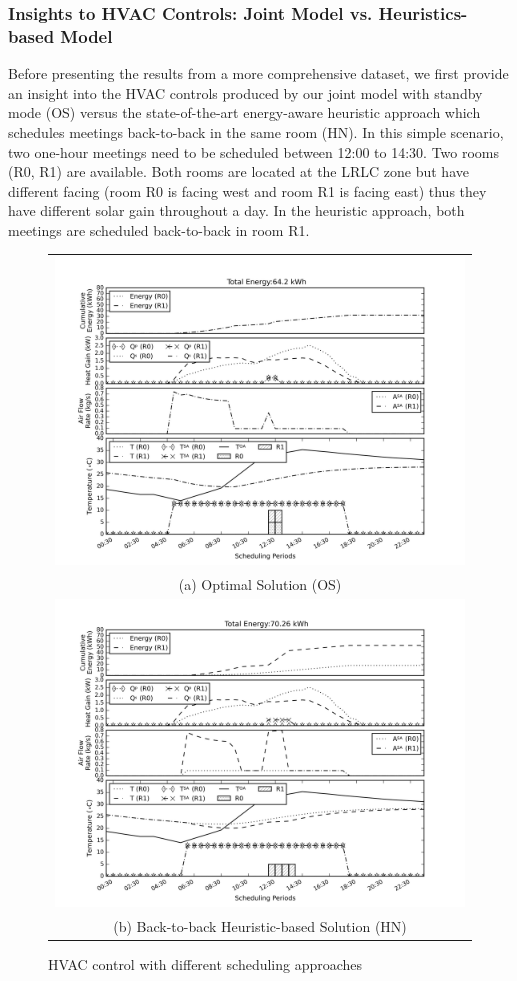 \subsubsection{Insights to HVAC Controls: Joint Model vs. Heuristics-based Model}
Before presenting the results from a more comprehensive dataset, we first provide an insight into the HVAC controls produced by our joint model with standby mode (OS) versus the state-of-the-art energy-aware heuristic approach which schedules meetings back-to-back in the same room (HN). In this simple scenario, two one-hour meetings need to be scheduled between 12:00 to 14:30. Two rooms (R0, R1) are available. Both rooms are located at the LRLC zone but have different facing (room R0 is facing west and room R1 is facing east) thus they have different solar gain throughout a day. In the heuristic approach, both meetings are scheduled back-to-back in room R1.

\begin{figure}
\begin{tabular}{c}
  \includegraphics[width=0.9\linewidth]{figs/lrlc_opt_ws.png} \\
(a) Optimal Solution (OS) \\[6pt]
  \includegraphics[width=0.9\linewidth]{figs/lrlc_b2b_ns.png} \\
(b) Back-to-back Heuristic-based Solution (HN) \\[6pt]
\end{tabular}
\caption{HVAC control with different scheduling approaches}
\label{fig:mip_scheap}
\end{figure}


